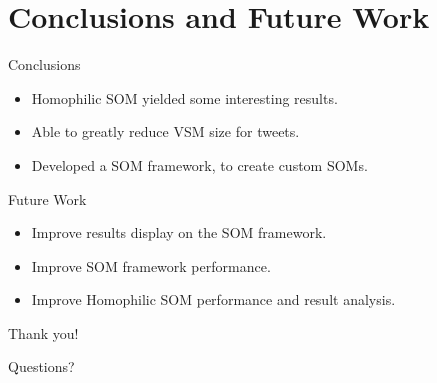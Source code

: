 \section{Conclusions and Future Work}

\begin{frame}{Conclusions}
  \begin{itemize}
    \item Homophilic SOM yielded some interesting results.
    \item Able to greatly reduce VSM size for tweets.
    \item Developed a SOM framework, to create custom SOMs.
  \end{itemize}
\end{frame}

\begin{frame}{Future Work}
  \begin{itemize}
    \item Improve results display on the SOM framework.
    \item Improve SOM framework performance.
    \item Improve Homophilic SOM performance and result analysis.
  \end{itemize}
\end{frame}

\begin{frame}
  \begin{center}
    \huge Thank you!
    \vspace{0.5cm}

    \Large Questions?
  \end{center}
\end{frame}

